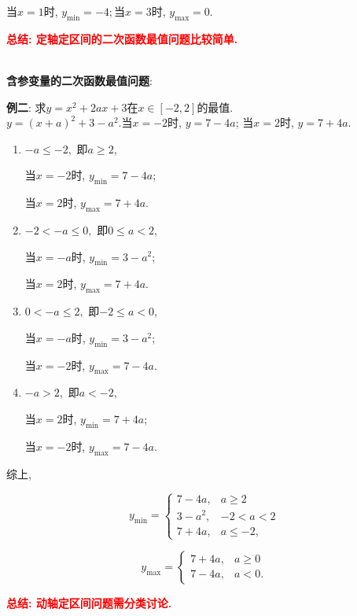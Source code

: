 \documentclass[8pt]{article}
\begin{document}
			    	当$x=1$时, $y_{\min}=-4; $当$x=3$时, $y_{\max}=0.$

					\textbf{\textcolor{red}{总结: 定轴定区间的二次函数最值问题比较简单.}}

				~\\

				\textbf{含参变量的二次函数最值问题}:

				\textbf{例二}: 求$y=x^2+2ax+3$在$x\in[-2, 2]$的最值.
					~\\

					$y=(x+a)^2+3-a^2. $当$x=-2$时, $y=7-4a$; 当$x=2$时, $y=7+4a$.

					\begin{enumerate}[label=$\arabic*^{\circ}$]
						\item $-a\leq -2,$ 即$a\geq 2$,

							当$x=-2$时, $y_{\min}=7-4a$;

							当$x=2$时, $y_{\max}=7+4a$.

						\item $-2<-a\leq 0,$ 即$0\leq a<2$,

							当$x=-a$时, $y_{\min}=3-a^2$;

							当$x=2$时, $y_{\max}=7+4a$.

						\item $0<-a\leq 2,$ 即$-2\leq a<0$,

							当$x=-a$时, $y_{\min}=3-a^2$;

							当$x=-2$时, $y_{\max}=7-4a$.

						\item $-a>2,$ 即$a<-2$,

							当$x=2$时, $y_{\min}=7+4a$;

							当$x=-2$时, $y_{\max}=7-4a$.
					\end{enumerate}

					综上,

					$$
					y_{\min}=\left\{\begin{array}{rl}7-4a,& a\geq 2\\ 3-a^2,& -2<a<2\\ 7+4a, &a\leq -2,\end{array}\right.
					$$

					$$
					y_{\max}=\left\{\begin{array}{rl}7+4a,& a\geq 0\\ 7-4a, &a<0. \end{array}\right.
					$$

					\textbf{\textcolor{red}{总结: 动轴定区间问题需分类讨论.}}
\end{document}
